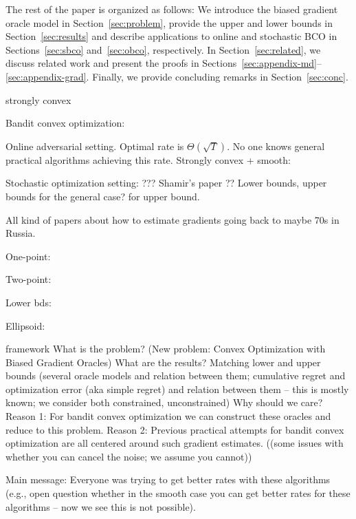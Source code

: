
The rest of the paper is organized  as follows: We introduce the biased gradient oracle model in Section~\ref{sec:problem}, provide the upper and lower bounds in Section~\ref{sec:results} and describe applications to online and stochastic BCO in Sections~\ref{sec:sbco} and~\ref{sec:obco}, respectively. In Section~\ref{sec:related}, we discuss related work and present the proofs in Sections~\ref{sec:appendix-md}--\ref{sec:appendix-grad}. Finally, we provide concluding remarks in Section~\ref{sec:conc}.




strongly convex


Bandit convex optimization:

Online adversarial setting. Optimal rate is $\Theta(\sqrt{T})$.
No one knows general practical algorithms achieving this rate.
Strongly convex + smooth: \cite{hazan2014bandit}

Stochastic optimization setting: ??? Shamir's paper \cite{shamir2012complexity}??
Lower bounds, upper bounds for the general case?
\cite{hazan2014bandit} for upper bound.

All kind of papers about how to estimate gradients going back to maybe 70s in Russia.

One-point: \cite{flaxman2005online}

Two-point: \cite{AgDeXi10}

Lower bds: \cite{raginsky2011information} \cite{Chen88:LB-AoS}

Ellipsoid: \cite{AgFoHsuKaRa13:SIAM}



 framework
What is the problem? (New problem: Convex Optimization with Biased Gradient Oracles)
What are the results? Matching lower and upper bounds (several oracle models and relation between them; cumulative regret and optimization error (aka simple regret) and relation between them -- this is mostly known; we consider both constrained, unconstrained)
Why should we care?
Reason 1: For bandit convex optimization we can construct these oracles and reduce to this problem.
Reason 2: Previous practical attempts for bandit convex optimization are all centered around such gradient estimates.
((some issues with whether you can cancel the noise; we assume you cannot))

Main message: Everyone was trying to get better rates with these algorithms (e.g., open question whether in the smooth case you can get better rates for these algorithms -- now we see this is not possible).
\fi
